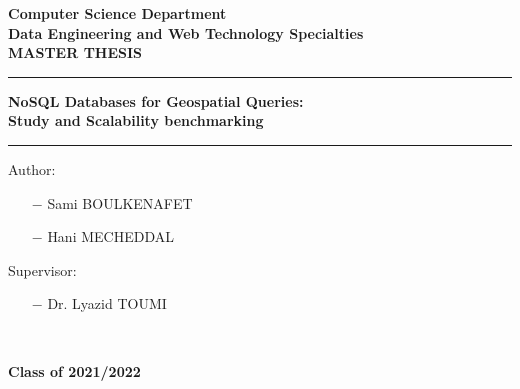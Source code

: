 \begin{titlepage}
  \begin{center}
    \textbf{\large{Computer Science Department}}
    \vspace{0.2cm}
    \\
    \textbf{\large{Data Engineering and Web Technology Specialties}}
    \vspace{1cm}
    \\
    \textbf{\large\uppercase{Master Thesis}}
  \end{center}
  \begin{center}
    \color{cyan}\rule{0.7\textwidth}{2pt}
  \end{center}
  \begin{center}
    \vspace{0.2cm}
    \textbf{\Large{NoSQL Databases for Geospatial Queries:}}
    \\
    \textbf{\Large{Study and Scalability benchmarking}
    }
    \vspace{0.2cm}
  \end{center}

  \begin{center}
    \color{cyan}\rule{0.7\textwidth}{2pt}
  \end{center}
  \vspace{1cm}
  \begin{center}
    \begin{minipage}[t]{0.4\textwidth}
      \begin{flushleft}
        \large{Author:}\\
        \begin{itemize}
          \item [$-$] \large{Sami BOULKENAFET}
          \item [$-$] \large{Hani MECHEDDAL}
        \end{itemize}
      \end{flushleft}
    \end{minipage}
    \begin{minipage}[t]{0.3\textwidth}
      \begin{flushleft}
        \large{Supervisor:} \\
        \begin{itemize}
          \item [$-$] \large{Dr. Lyazid TOUMI}
        \end{itemize}
      \end{flushleft}

    \end{minipage}\\[2cm]
  \end{center}
  \begin{center}
    \textbf{\Large{Class of 2021/2022}}
  \end{center}
\end{titlepage}
\newpage
